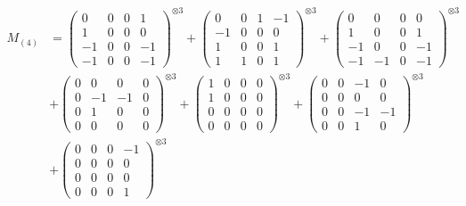 \documentclass{article}
\newcommand{\Mthree}{%
    M_{(4)}
}
\begin{document}
        \newpage
        
        \footnotesize{
        \begin{align}
        \Mthree
        &= \label{Rs16-Rc11-Solution-21-c1} \begin{pmatrix} 0 & 0 & 0 & 1 \\ 1 & 0 & 0 & 0 \\ -1 & 0 & 0 & -1 \\ -1 & 0 & 0 & -1 \end{pmatrix}^{\otimes 3} 
            + \begin{pmatrix} 0 & 0 & 1 & -1 \\ -1 & 0 & 0 & 0 \\ 1 & 0 & 0 & 1 \\ 1 & 1 & 0 & 1 \end{pmatrix}^{\otimes 3} 
            + \begin{pmatrix} 0 & 0 & 0 & 0 \\ 1 & 0 & 0 & 1 \\ -1 & 0 & 0 & -1 \\ -1 & -1 & 0 & -1 \end{pmatrix}^{\otimes 3} \\
        &+ \label{Rs16-Rc11-Solution-21-c4} \begin{pmatrix} 0 & 0 & 0 & 0 \\ 0 & -1 & -1 & 0 \\ 0 & 1 & 0 & 0 \\ 0 & 0 & 0 & 0 \end{pmatrix}^{\otimes 3} 
            + \begin{pmatrix} 1 & 0 & 0 & 0 \\ 1 & 0 & 0 & 0 \\ 0 & 0 & 0 & 0 \\ 0 & 0 & 0 & 0 \end{pmatrix}^{\otimes 3} 
            + \begin{pmatrix} 0 & 0 & -1 & 0 \\ 0 & 0 & 0 & 0 \\ 0 & 0 & -1 & -1 \\ 0 & 0 & 1 & 0 \end{pmatrix}^{\otimes 3} \\
        &+ \label{Rs16-Rc11-Solution-21-c7} \begin{pmatrix} 0 & 0 & 0 & -1 \\ 0 & 0 & 0 & 0 \\ 0 & 0 & 0 & 0 \\ 0 & 0 & 0 & 1 \end{pmatrix}^{\otimes 3} 

\end{align}}
\end{document}
